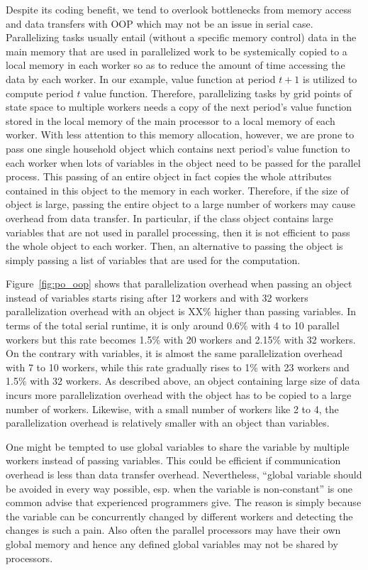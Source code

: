 \documentclass[12pt]{article}
\begin{document}
Despite its coding benefit, we tend to overlook bottlenecks from memory access and data transfers with OOP which may not be an issue in serial case. Parallelizing tasks usually entail (without a specific memory control) data in the main memory that are used in parallelized work to be systemically copied to a local memory in each worker so as to reduce the amount of time accessing the data by each worker. In our example, value function at period $t+1$ is utilized to compute period $t$ value function. Therefore, parallelizing tasks by grid points of state space to multiple workers needs a copy of the next period's value function stored in the local memory of the main processor to a local memory of each worker. With less attention to this memory allocation, however, we are prone to pass one single household object which contains next period's value function to each worker when lots of variables in the object need to be passed for the parallel process. This passing of an entire object in  fact copies the whole attributes contained in this object to the memory in each worker. Therefore, if the size of object is large, passing the entire object to a large number of workers may cause overhead from data transfer. In particular, if the class object contains large variables that are not used in parallel processing, then it is not efficient to pass the whole object to each worker. Then, an alternative to passing the object is simply passing a list of variables that are used for the computation.



Figure~\ref{fig:po_oop} shows that parallelization overhead when passing an object instead of variables starts rising after 12 workers and with 32 workers parallelization overhead with an object is XX\% higher than passing variables. In terms of the total serial runtime, it is only around 0.6\% with 4 to 10 parallel workers but this rate becomes 1.5\% with 20 workers and 2.15\% with 32 workers. On the contrary with variables, it is almost the same parallelization overhead with 7 to 10 workers, while this rate gradually rises to 1\% with 23 workers and 1.5\% with 32 workers. As described above, an object containing large size of data incurs more parallelization overhead with the object has to be copied to a large number of workers. Likewise, with a small number of workers like 2 to 4, the parallelization overhead is relatively smaller with an object than variables.

One might be tempted to use global variables to share the variable by multiple workers instead of passing variables. This could be efficient if communication overhead is less than data transfer overhead. Nevertheless, ``global variable should be avoided in every way possible, esp. when the variable is non-constant'' is one common advise that experienced programmers give. The reason is simply because the variable can be concurrently changed by different workers and detecting the changes is such a pain. Also often the parallel processors may have their own global memory and hence any defined global variables may not be shared by processors.
\end{document}
